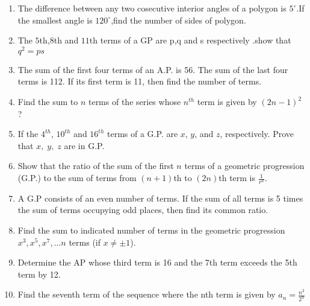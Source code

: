 \begin{enumerate}[label=\thesection.\arabic*,ref=\thesection.\theenumi]
\item The difference between any two cosecutive interior angles of a polygon is $5^\circ$.If the smallest angle is $120^\circ$,find the number of sides of polygon. \\
\solution

\pagebreak
\item The $5$th,$8$th and $11$th terms of a GP are p,q and s respectively .show that $q^2=ps$ \\
\solution

\pagebreak
\item The sum of the first four terms of an A.P. is 56. The sum of the last four terms is
 112. If its first term is 11, then find the number of terms.\\
\solution

\pagebreak
\item Find the sum to $n$ terms of the series whose $n^{th}$ term is given by $(2n-1)^2$ ? 
\solution

\pagebreak
\item If the $4^{th}$, $10^{th}$ and $16^{th}$ terms of a G.P. are $x$, $y$, and $z$, respectively. Prove that $x,\; y,\; z$ are in G.P. \\
\solution

\pagebreak
\item Show that the ratio of the sum of the first \(n\) terms of a geometric progression (G.P.) to the sum of terms from \((n+1)\)th to \((2n)\)th term is \(\frac{1}{r^n}\).
\solution

\pagebreak
\item A G.P consists of an even number of terms. If the sum of all terms is 5 times the sum of terms occupying odd places, then find its common ratio.\\
\solution

\pagebreak
\item Find the sum to indicated number of terms in the geometric progression $x^3,x^5,x^7,...n$ terms (if $x\neq\pm1$).\\
\solution

\pagebreak
\item Determine the AP whose third term is 16 and the 7th term exceeds the 5th term by 12. \\
\solution

\pagebreak
\item Find the seventh term of the sequence where the nth term is given by $a_n= \frac {n^2}{2^{n}}$\\
\solution


\end{enumerate}
